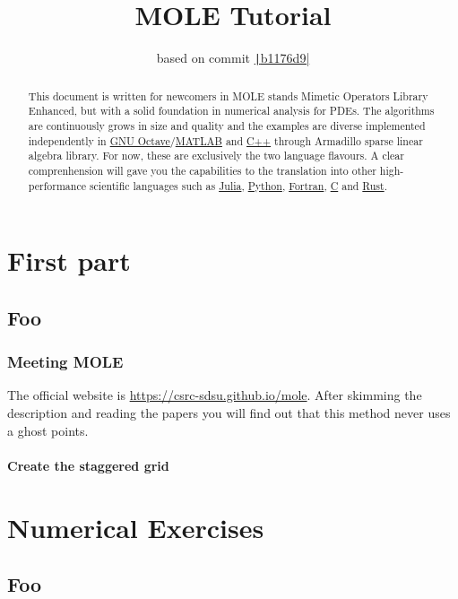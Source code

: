 \documentclass[a4paper,abstract=true]{scrreprt}
\title{\color{DarkBlue}MOLE Tutorial}
\author{based on commit \href{https://github.com/csrc-sdsu/mole/tree/b1176d9969e807fb62bed8fee28bc0eb9648a93a}{\texttt|b1176d9|}}
\begin{document}
\maketitle

\begin{abstract}
	This document is written for newcomers in MOLE stands
	Mimetic Operators Library Enhanced, but with a solid foundation
	in numerical analysis for PDEs.
	The algorithms are continuously grows in size and quality and the
	examples are diverse implemented independently in
	\href{https://octave.org}{GNU Octave}/\href{https://www.mathworks.com/products/matlab.html}{MATLAB}
	and \href{https://isocpp.org}{C++} through Armadillo sparse
	linear algebra library.
	For now, these are exclusively the two language flavours.
	A clear comprenhension will gave you the capabilities to the translation
	into other high-performance scientific languages such as \href{https://julialang.org}{Julia},
	\href{https://www.python.org}{Python}, \href{https://fortran-lang.org}{Fortran}, \href{https://www.open-std.org/jtc1/sc22/wg14}{C}
	and \href{https://www.rust-lang.org}{Rust}.
\end{abstract}

\part{First part}

\chapter{Foo}

\section{Meeting MOLE}

The official website is \url{https://csrc-sdsu.github.io/mole}.
After skimming the description and reading the papers you will find out that this method never uses a ghost points.

\subsection{Create the staggered grid}


\part{Numerical Exercises}

\chapter{Foo}
\end{document}
